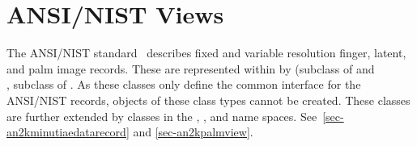 \section{ANSI/NIST Views}
The ANSI/NIST standard~\cite{std:an2k} describes fixed and variable resolution
finger, latent, and palm image records. These are represented within \sname
by  (subclass of  and\\
, subclass of .
As these classes only define the common interface for the ANSI/NIST records,
objects of these class types cannot be created. These classes are further
extended by classes in the , , and
 name spaces. See~\ref{sec-an2kminutiaedatarecord} and
\ref{sec-an2kpalmview}.
